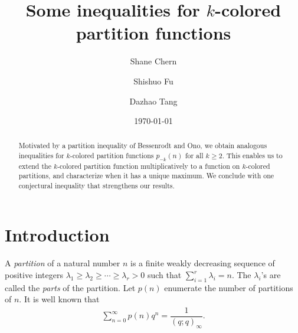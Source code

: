 \documentclass[12pt,reqno]{amsart}
\numberwithin{equation}{section}
\theoremstyle{plain}
\theoremstyle{definition}
\begin{document}
\title[Some inequalities for $k$-colored partition functions]{Some inequalities for $k$-colored partition functions}

\author[S. Chern]{Shane Chern}
\address[Shane Chern]{Department of Mathematics, The Pennsylvania State University, University Park, PA 16802, USA}

\author[S. Fu]{Shishuo Fu}
\address[Shishuo Fu]{College of Mathematics and Statistics, Chongqing University, Huxi Campus LD506, Chongqing 401331, P.R. China}

\author[D. Tang]{Dazhao Tang}

\address[Dazhao Tang]{College of Mathematics and Statistics, Chongqing University, Huxi Campus LD206, Chongqing 401331, P.R. China}

\date{\today}


\begin{abstract}
Motivated by a partition inequality of Bessenrodt and Ono, we obtain analogous inequalities for $k$-colored partition functions $p_{-k}(n)$ for all $k\geq2$. This enables us to extend the $k$-colored partition function multiplicatively to a function on $k$-colored partitions, and characterize when it has a unique maximum. We conclude with one conjectural inequality that strengthens our results.
\end{abstract}




\maketitle






\section{Introduction}\label{sec1}
A \emph{partition} \cite{Andr1976} of a natural number $n$ is a finite weakly decreasing sequence of positive integers $\lambda_{1}\geq\lambda_{2}\geq\cdots\geq\lambda_{r}>0$ such that $\sum_{i=1}^{r}\lambda_{i}=n$. The $\lambda_{i}$'s are called the \emph{parts} of the partition. Let $p(n)$ enumerate the number of partitions of $n$. It is well known that
\begin{align}\label{ordi part func}
\sum_{n=0}^{\infty}p(n)q^{n}=\dfrac{1}{(q;q)_{\infty}}.
\end{align}
\end{document}
